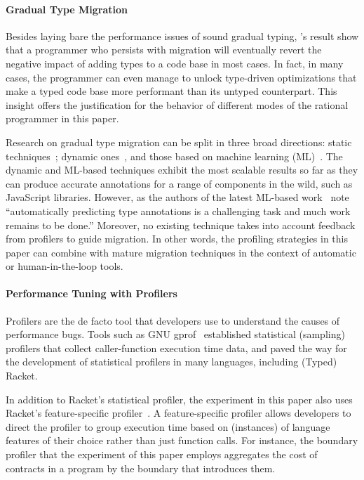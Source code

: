 \paragraph{Gradual Type Migration} Besides laying bare the performance
issues of sound gradual typing, \citet{gtnffvf-jfp-2019}'s result show
that a programmer who persists with migration will eventually revert the
negative impact of adding types to a code base in most cases. In fact, in
many cases, the programmer can even manage to unlock type-driven
optimizations that make a typed code base more performant than its untyped
counterpart. This insight offers the justification for the behavior of 
different modes of the rational programmer in this paper. 

Research on gradual type migration can be split in three broad directions:
static techniques~\cite{rch:in-out-infer-gt, km:ts-type-evo,
mp:gt-decidable, ccew:gt-migrate, gc:gt-infer,
cagg-solver-based-migration,clps-popl-2020,js-infer,ruby-static-infer,unif-infer};
dynamic
ones~\cite{msi:gt-infer-hm, dyn-infer-ruby, profile-guided-typing, gen-ts-decl, jstrace},
and those based on machine learning
(ML)~\cite{lambdanet,nl2ptype,learn-types-big-data,ml-ts}. The dynamic
and ML-based techniques exhibit the most scalable results so far as they
can produce accurate annotations for a range of components in the wild,
such as JavaScript libraries. However, as the authors of the latest
ML-based work~\cite{ml-ts} note ``automatically predicting type annotations is a
challenging task and much work remains to be done.'' Moreover, no existing
technique takes into account feedback from profilers to guide migration.
In other words,  the profiling strategies in this paper can combine
with mature migration techniques in the context of automatic or
human-in-the-loop tools.
 
\paragraph{Performance Tuning with Profilers} Profilers are the de facto
tool that developers use to understand the causes of performance bugs. 
Tools such as GNU gprof~\cite{gprof} established statistical (sampling) 
profilers that collect caller-function execution time data, and paved the
way for the development of statistical profilers in many languages,
including (Typed) Racket.

In addition to Racket's statistical profiler, the experiment in this
paper also uses Racket's feature-specific
profiler~\cite{astavf-feature-prf, staaf-feature-prf}. A
feature-specific profiler allows developers to direct the profiler to
group execution time based on (instances) of language features of
their choice rather than just function calls.  For instance, the
boundary profiler that the experiment of this paper employs aggregates
the cost of contracts in a program by the boundary that introduces
them.

